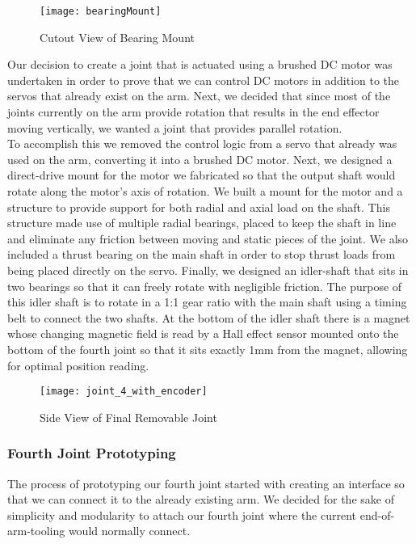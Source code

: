 \begin{figure}[H]
	\centering
	\texttt{[image: bearingMount]}
	\caption{Cutout View of Bearing Mount}
	\label{Cutout View of Bearing Mount}
\end{figure}


\noindent Our decision to create a joint that is actuated using a brushed DC motor was undertaken in order to prove that we can control DC motors in addition to the servos that already exist on the arm.  Next, we decided that since most of the joints currently on the arm provide rotation that results in the end effector moving vertically, we wanted a joint that provides parallel rotation. \\

To accomplish this we removed the control logic from a servo that already was used on the arm, converting it into a brushed DC motor. Next, we designed a direct-drive mount for the motor we fabricated so that the output shaft would rotate along the motor's axis of rotation.  We built a mount for the motor and a structure to provide support for both radial and axial load on the shaft. This structure made use of multiple radial bearings, placed to keep the shaft in line and eliminate any friction between moving and static pieces of the joint.  We also included a thrust bearing on the main shaft in order to stop thrust loads from being placed directly on the servo.  Finally, we designed an idler-shaft that sits in two bearings so that it can freely rotate with negligible friction. The purpose of this idler shaft is to rotate in a 1:1 gear ratio with the main shaft using a timing belt to connect the two shafts.  At the bottom of the idler shaft there is a magnet whose changing magnetic field is read by a Hall effect sensor mounted onto the bottom of the fourth joint so that it sits exactly 1mm from the magnet, allowing for optimal position reading.  \\

\begin{figure}[H]
	\centering
	\texttt{[image: joint\_4\_with\_encoder]}
	\caption{Side View of Final Removable Joint}
	\label{fig:Side View of Joint 4}
\end{figure}

\subsubsection{Fourth Joint Prototyping}


The process of prototyping our fourth joint started with creating an interface so that we can connect it to the already existing arm.  We decided for the sake of simplicity and modularity to attach our fourth joint where the current end-of-arm-tooling would normally connect.


